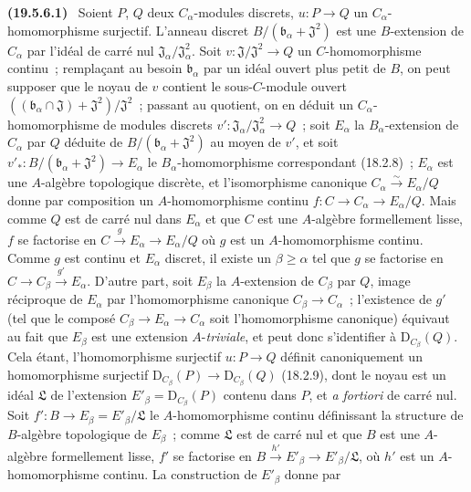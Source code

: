 \documentclass[10pt,oneside]{book}
\makeatletter
\newcommand{\setmanualcurrentlabel}[1]{\def\@currentlabel{#1}}
\newenvironment{env}[1][]{\setmanualcurrentlabel{#1}\par\medskip\noindent\textbf{(#1)}\ }{\par}
\makeatother
\begin{document}
\begin{env}[19.5.6.1]
\label{0.19.5.6.1-fr}
Soient $P$, $Q$ deux $C_\alpha$-modules discrets,
$u:P\to Q$ un $C_\alpha$-homomorphisme surjectif. L'anneau discret
$B/(\mathfrak b_\alpha+\mathfrak J^2)$ est une $B$-extension de $C_\alpha$ par
l'idéal de carré nul $\mathfrak J_\alpha/\mathfrak J_\alpha^2$. Soit
$v:\mathfrak J/\mathfrak J^2\to Q$ un $C$-homomorphisme continu~; remplaçant
au besoin $\mathfrak b_\alpha$ par un idéal ouvert plus petit de $B$, on peut
supposer que le noyau de $v$ contient le sous-$C$-module ouvert
$((\mathfrak b_\alpha\cap\mathfrak J)+\mathfrak J^2)/\mathfrak J^2$~;
passant au quotient, on en déduit un $C_\alpha$-homomorphisme de modules
discrets $v':\mathfrak J_\alpha/\mathfrak J_\alpha^2\to Q$~; soit
$E_\alpha$ la $B_\alpha$-extension de $C_\alpha$ par $Q$ déduite de
$B/(\mathfrak b_\alpha+\mathfrak J^2)$ au moyen de $v'$, et soit
$v'_*:B/(\mathfrak b_\alpha+\mathfrak J^2)\to E_\alpha$ le
$B_\alpha$-homomorphisme correspondant (18.2.8)~; $E_\alpha$ est une
$A$-algèbre topologique discrète, et l'isomorphisme canonique
$C_\alpha\xrightarrow{\sim}E_\alpha/Q$ donne par composition un
$A$-homomorphisme continu $f:C\to C_\alpha\to E_\alpha/Q$. Mais comme $Q$ est
de carré nul dans $E_\alpha$ et que $C$ est une $A$-algèbre formellement
lisse, $f$ se factorise en $C\xrightarrow{g}E_\alpha\to E_\alpha/Q$ où $g$
est un $A$-homomorphisme continu. Comme $g$ est continu et $E_\alpha$ discret,
il existe un $\beta\geq\alpha$ tel que $g$ se factorise en
$C\to C_\beta\xrightarrow{g'}E_\alpha$. D'autre part, soit $E_\beta$ la
$A$-extension de $C_\beta$ par $Q$, image réciproque de $E_\alpha$ par
l'homomorphisme canonique $C_\beta\to C_\alpha$~; l'existence de $g'$ (tel que
le composé $C_\beta\to E_\alpha\to C_\alpha$ soit l'homomorphisme canonique)
équivaut au fait que $E_\beta$ est une extension $A$-\emph{triviale}, et peut
donc s'identifier à $\mathrm D_{C_\beta}(Q)$. Cela étant, l'homomorphisme
surjectif $u:P\to Q$ définit canoniquement un homomorphisme surjectif
$\mathrm D_{C_\beta}(P)\to\mathrm D_{C_\beta}(Q)$ (18.2.9), dont le noyau est
un idéal $\mathfrak L$ de l'extension $E'_\beta=\mathrm D_{C_\beta}(P)$
contenu dans $P$, et \emph{a fortiori} de carré nul. Soit
$f':B\to E_\beta=E'_\beta/\mathfrak L$ le $A$-homomorphisme continu définissant
la structure de $B$-algèbre topologique de $E_\beta$~; comme $\mathfrak L$ est
de carré nul et que $B$ est une $A$-algèbre formellement lisse, $f'$ se
factorise en $B\xrightarrow{h'}E'_\beta\to E'_\beta/\mathfrak L$, où $h'$ est
un $A$-homomorphisme continu. La construction de $E'_\beta$ donne par

\end{env}
\end{document}
